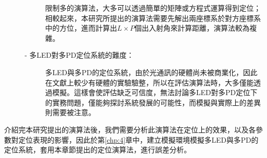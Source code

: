 \begin{description}
\begin{description}
        \qquad
        限制多的演算法，大多可以透過簡單的矩陣或方程式運算得到定位；相較起來，本研究所提出的演算法需要先解出兩座標系於對方座標系中的方位，進而計算出$L\times P$個出入射角來計算距離，演算法較為複雜。

        \item[- 多LED對多PD定位系統的難度：] \hfill
        
        \qquad
        多LED與多PD的定位系統，由於光通訊的硬體尚未被商業化，因此在文獻上較少有硬體的實驗驗整，所以在評估演算法時，大多僅能透過模擬。這樣會使評估缺乏可信度，無法討論多LED對多PD定位下的實務問題，僅能夠探討系統發展的可能性，而模擬與實際上的差異則需要被注意。
    \end{description}
    
\end{description}

介紹完本研究提出的演算法後，我們需要分析此演算法在定位上的效果，以及各參數對定位表現的影響，因此於第\ref{chp:4}章中，建立模擬環境模擬多LED與多PD的定位系統，套用本章節提出的定位演算法，進行誤差分析。










